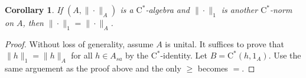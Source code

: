 \documentclass{article}
\newtheorem{corollary}{Corollary}[section]
\begin{document}
\begin{corollary}
If $(A,\| \cdot \|_A)$ is a $\mathrm{C}^*$-algebra and $\| \cdot \|_1$ is another $\mathrm{C}^*$-norm on $A$, then $\| \cdot \|_1 = \| \cdot \|_A$.
\end{corollary}

\begin{proof}
Without loss of generality, assume $A$ is unital. It suffices to prove that $\| h\|_1 = \| h\|_A$ for all $h \in A_{sa}$ by the $\mathrm{C}^*$-identity. Let $B=\mathrm{C}^* (h,1_A)$. Use the same arguement as the proof above and the only $\geq$ becomes $=$.
\end{proof}





\end{document}
